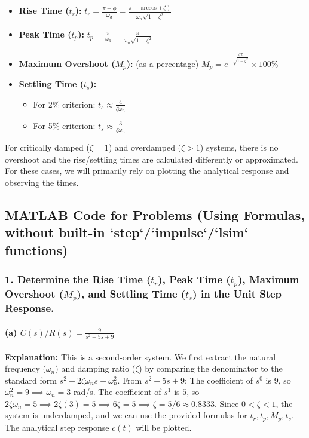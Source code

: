 \documentclass{article}
\begin{document}
	\begin{itemize}
		\item \textbf{Rise Time ($t_r$):}
		$t_r = \frac{\pi - \phi}{\omega_d} = \frac{\pi - \arccos(\zeta)}{\omega_n \sqrt{1-\zeta^2}}$
		
		\item \textbf{Peak Time ($t_p$):}
		$t_p = \frac{\pi}{\omega_d} = \frac{\pi}{\omega_n \sqrt{1-\zeta^2}}$
		
		\item \textbf{Maximum Overshoot ($M_p$):} (as a percentage)
		$M_p = e^{-\frac{\zeta\pi}{\sqrt{1-\zeta^2}}} \times 100\%$
		
		\item \textbf{Settling Time ($t_s$):}
		\begin{itemize}
			\item For 2\% criterion: $t_s \approx \frac{4}{\zeta\omega_n}$
			\item For 5\% criterion: $t_s \approx \frac{3}{\zeta\omega_n}$
		\end{itemize}
	\end{itemize}
	For critically damped ($\zeta=1$) and overdamped ($\zeta>1$) systems, there is no overshoot and the rise/settling times are calculated differently or approximated. For these cases, we will primarily rely on plotting the analytical response and observing the times.
	
	\subsection*{MATLAB Code for Problems (Using Formulas, without built-in `step`/`impulse`/`lsim` functions)}
	
	\subsubsection*{1. Determine the Rise Time ($t_r$), Peak Time ($t_p$), Maximum Overshoot ($M_p$), and Settling Time ($t_s$) in the Unit Step Response.}
	
	\paragraph{(a) $C(s)/R(s) = \frac{9}{s^2+5s+9}$}
	\textbf{Explanation:}
	This is a second-order system. We first extract the natural frequency ($\omega_n$) and damping ratio ($\zeta$) by comparing the denominator to the standard form $s^2 + 2\zeta\omega_n s + \omega_n^2$.
	From $s^2+5s+9$:
	The coefficient of $s^0$ is $9$, so $\omega_n^2 = 9 \implies \omega_n = 3$ rad/s.
	The coefficient of $s^1$ is $5$, so $2\zeta\omega_n = 5 \implies 2\zeta(3) = 5 \implies 6\zeta = 5 \implies \zeta = 5/6 \approx 0.8333$.
	Since $0 < \zeta < 1$, the system is underdamped, and we can use the provided formulas for $t_r, t_p, M_p, t_s$.
	The analytical step response $c(t)$ will be plotted.
	
\end{document}
